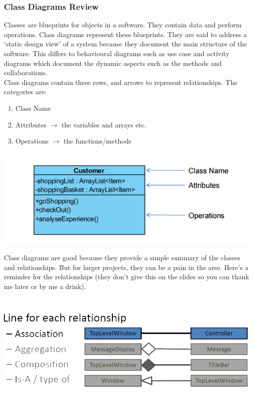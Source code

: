 \documentclass{article}
\begin{document}
\subsubsection{Class Diagrams Review}
Classes are blueprints for objects in a software. They contain data and perform operations. Class diagrams represent these blueprints. They are said to address a `static design view' of a system because they document the main structure of the software. This differs to behavioural diagrams such as use case and activity diagrams which document the dynamic aspects such as the methods and collaborations.
\\
Class diagrams contain three rows, and arrows to represent relationships. The categories are:
\begin{enumerate}
\item Class Name 
\item Attributes $\longrightarrow$ the variables and arrays etc.
\item Operations $\longrightarrow$ the functions/methods
\end{enumerate}

\includegraphics[scale = 0.6]{class1} %

\newpage
Class diagrams are good because they provide a simple summary of the classes and relationships. But for larger projects, they can be a pain in the arse. Here's a reminder for the relationships (they don't give this on the slides so you can thank me later or by me a drink).
\\\\\\ %
\includegraphics[scale = 0.35]{classRelationships}
\end{document}
